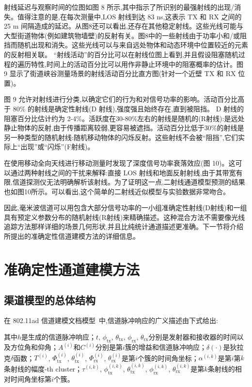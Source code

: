 射线延迟与观察时间的位图如图 8 所示,其中指示了所识别的最强射线的出现/消失。值得注意的是,在每次测量中,LOS 射线到达 83 ns,这表示 TX 和 RX 之间的 25 m 间隔造成的延迟。从图8还可以看出,还存在其他稳定射线。这些光线可能与大型街道物体(例如建筑物墙壁)的反射有关。图8中的一些射线由于功率小和/或阻挡而随机出现和消失。这些光线可以与来自远处物体和动态环境中位置较近的元素的反射相关联。 “射线活动”的百分比可以在射线位图上看到,并且假设阻塞随机过程的遍历特性,时间上的活动百分比可以用作非静止环境中的阻塞概率的估计。图 9 显示了街道峡谷测量场景的射线活动百分比直方图(针对一个近壁 TX 和 RX 位置)。

图 9 允许对射线进行分类,以确定它们的行为和对信号功率的影响。活动百分比高于 80\% 的射线是确定性射线(D 射线),强度强且始终存在,直到被阻挡。 D 射线的阻塞百分比估计约为 2-4\%。活跃度在30-80\%左右的射线是随机的(R射线):是远处静止物体的反射,由于传播距离较弱,更容易被遮挡。活动百分比低于30\%的射线是另一种类型的随机射线:随机移动物体的闪烁反射。这些射线不会被“阻挡”,它们实际上“出现”或“闪烁”(F射线)。

在使用移动全向天线进行移动测量时发现了深度信号功率衰落效应(图 10)。这可以通过两种射线之间的干扰来解释:直接 LOS 射线和地面反射射线,由于其带宽有限,信道探测仪无法明确解析该射线。为了证明这一点,二射线通道模型预测的结果也如图10所示。可以看出,这个简单的二射线近似模型与实验数据非常吻合。

因此,毫米波信道可以用包含大部分信号功率的一小组准确定性射线(D射线)和一组具有预定义参数分布的随机射线(R射线)来精确描述。这种混合方法不需要像光线追踪方法那样详细的场景几何形状,并且比纯统计通道描述更准确。下一节将介绍所提出的准确定性信道建模方法的详细信息。

\section{准确定性通道建模方法}
\subsection{渠道模型的总体结构}
在 802.11ad 信道建模文档模型~\cite{ieee80211ad}中,信道脉冲响应的广义描述由下式给出:

其中$h$是生成的信道脉冲响应；$t$, $\phi_{\text{tx}}$, $\theta_{\text{tx}}$, $\phi_{\text{rx}}$, $\theta_{\text{rx}}$分别是发射器和接收器的时间以及方位角和仰角；$A^{(i)}$和$C^{(i)}$分别是第$i$簇的增益和信道脉冲响应；$\delta(\cdot)$是狄拉克$\delta$函数；$T^{(i)}$, $\Phi_{\text{tx}}^{(i)}$, $\theta_{\text{tx}}^{(i)}$, $\Phi_{\text{rx}}^{(i)}$, $\theta_{\text{rx}}^{(i)}$是第$i$个簇的时间角坐标；$\alpha^{(i, k)}$是第$i$第$k$条射线的幅度-th cluster；$\tau^{(i, k)}$, $\phi_{\text{tx}}^{(i, k)}$, $\theta_{\text{tx}}^{(i, k)}$, $\phi_{\text{rx}}^{(i, k)}$, $\theta_{\text{rx}}^{(i, k)}$是第$k$条射线的相对时间角坐标第$i$个簇。


